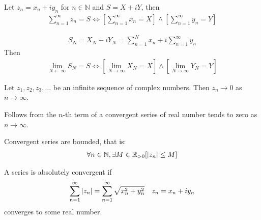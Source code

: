 \documentclass[12pt, english]{book}
\makeatletter
\renewenvironment{proof}[1][\proofname]{\par
	\pushQED{\qed}%
	\normalfont \topsep6\p@\@plus6\p@\relax
	\list{}{%
		\settowidth{\leftmargin}{\itshape\proofname:\hskip\labelsep}%
		\setlength{\labelwidth}{0pt}%
		\setlength{\itemindent}{-\leftmargin}%
	}%
	\item[\hskip\labelsep\itshape#1\@addpunct{:}]\ignorespaces
}{%
	\popQED\endlist\@endpefalse
}
\makeatother
\begin{document}
	\begin{theorem}
		Let \(z_n = x_n + iy_n\) for \(n \in \mathbb{N}\) and \(S = X + iY\), then
		\begin{align*}
			\sum_{n = 1}^{\infty} z_n = S 
			\iff \left[ \sum_{n = 1}^{\infty} x_n = X \right] \land 
				 \left[ \sum_{n = 1}^{\infty} y_n = Y \right]
		\end{align*}
	\end{theorem}
	\begin{proof}
		\begin{align*}
			S_N = X_N + iY_N = \sum_{n=1}^{N} x_n + i \sum_{n=1}^{\infty} y_n
		\end{align*}
		Then
		\begin{align*}
			\lim_{N \leftarrow \infty} S_N = S 
			\iff \left[ \lim_{N \rightarrow \infty} X_N = X  \right]
			\land  \left[ \lim_{N \rightarrow \infty} Y_N = Y  \right]
		\end{align*}
	\end{proof}

	\begin{corollary}
		Let \(z_1, z_2, z_3, \ldots \) be an infinite sequence of complex numbers. Then \(z_n \rightarrow 0\) as \(n \rightarrow \infty\).
	\end{corollary}
	\begin{proof}
		Follows from the \(n\)-th term of a convergent series of real number tends to zero as \(n \rightarrow \infty\).
	\end{proof}
	
	\begin{corollary}
		Convergent series are bounded, that is:
		\begin{align*}
			\forall n \in \mathbb{N}, \exists M \in \mathbb{R}_{>0} [\abs{z_n} \leq M]
		\end{align*}
	\end{corollary}
	
	\begin{definition}
		A series is absolutely convergent if
		\begin{align*}
			\sum_{n=1}^{\infty} \abs{z_n} &= \sum_{n=1}^{\infty} \sqrt{x_n^2 + y_n^2} 
				& z_n = x_n + iy_n
		\end{align*}
		converges to some real number. 
	\end{definition}
\end{document}
